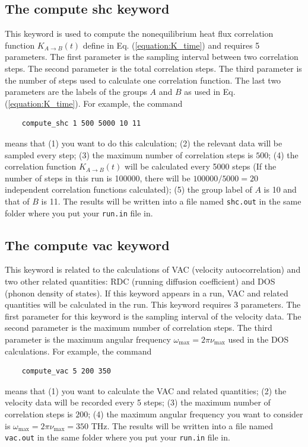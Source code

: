 \documentclass[12pt,a4paper]{report}
\begin{document}
\subsection{The compute shc keyword}

This keyword is used to compute the nonequilibrium heat flux correlation function $K_{A \rightarrow B}(t)$ define in Eq. (\ref{equation:K_time}) and requires 5 parameters. The first parameter is the sampling interval between two correlation steps. The second parameter is the total correlation steps. The third parameter is the number of steps used to calculate one correlation function. The last two parameters are the labels of the groups $A$ and $B$ as used in Eq. (\ref{equation:K_time}). For example, the command
\begin{verbatim}
    compute_shc 1 500 5000 10 11
\end{verbatim}
means that (1) you want to do this calculation; (2) the relevant data will be sampled every step; (3) the maximum number of correlation steps is $500$; (4) the correlation function $K_{A \rightarrow B}(t)$ will be calculated every 5000 steps (If the number of steps in this run is 100000, there will be $100000/5000=20$ independent correlation functions calculated); (5) the group label of $A$ is 10 and that of $B$ is 11. The results will be written into a file named \verb"shc.out" in the same folder where you put your \verb"run.in" file in.


\subsection{The compute vac keyword}

This keyword is related to the calculations of VAC (velocity autocorrelation) and two other related quantities: RDC (running diffusion coefficient) and DOS (phonon density of states).
If this keyword appears in a run, VAC and related quantities will be calculated in the run. This keyword requires 3 parameters.
The first parameter for this keyword is the sampling interval of the velocity data. The second parameter is the maximum number of correlation steps. The third parameter is the maximum angular frequency $\omega_{\text{max}}=2\pi \nu_{\text{max}}$ used in the DOS calculations. For example, the command
\begin{verbatim}
    compute_vac 5 200 350
\end{verbatim}
means that (1) you want to calculate the VAC and related quantities; (2) the velocity data will be recorded every 5 steps; (3) the maximum number of correlation steps is $200$; (4) the maximum angular frequency you want to consider is $\omega_{\text{max}}=2\pi \nu_{\text{max}}= 350$ THz. The results will be written into a file named \verb"vac.out" in the same folder where you put your \verb"run.in" file in.
\end{document}
